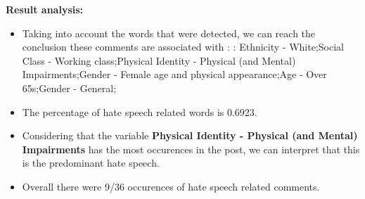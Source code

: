 \documentclass[11pt]{article}
\begin{document}
\textbf{\Large Result analysis:}

\begin{itemize}\item Taking into account the words that were detected, we can reach the conclusion these comments are associated with : : Ethnicity - White;Social Class - Working class;Physical Identity - Physical (and Mental) Impairments;Gender - Female age and physical appearance;Age - Over 65s;Gender - General;%

\item The percentage of hate speech related words is 0.6923.

\item Considering that the variable \textbf{Physical Identity - Physical (and Mental) Impairments} has the most occurences in the post, we can interpret that this is the predominant hate speech.

\item Overall there were 9/36 occurences of hate speech related comments.\end{itemize}
\end{document}
